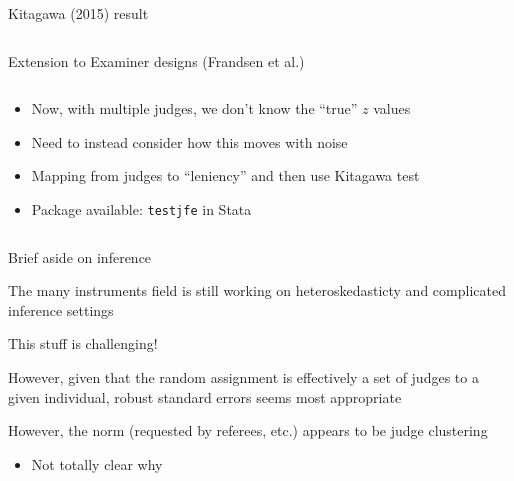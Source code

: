 \documentclass[notes,11pt, aspectratio=169]{beamer}
\newenvironment{wideitemize}{\itemize\addtolength{\itemsep}{10pt}}{\enditemize}
\begin{document}
\begin{frame}{Kitagawa (2015) result}
\begin{columns}[onlytextwidth, T]
\begin{column}{.5\textwidth}
    \end{column}%
  \end{columns}
\end{frame}

\begin{frame}{Extension to Examiner designs (Frandsen et al.)}
  \begin{columns}[onlytextwidth, T] %
    \begin{column}{.5\textwidth}
      \begin{itemize}
      \item Now, with multiple judges, we don't know the ``true'' $z$ values
      \item Need to instead consider how this moves with noise
      \item Mapping from judges to ``leniency'' and then use Kitagawa test
        \item Package available: \texttt{testjfe} in Stata
      \end{itemize}
    \end{column}%
    \hfill%
    \begin{column}{.5\textwidth}
    \end{column}%
  \end{columns}
\end{frame}


\begin{frame}{Brief aside on inference}
  \begin{wideitemize}
  \item The many instruments field is still working on heteroskedasticty and complicated inference settings
  \item This stuff is challenging!
  \item However, given that the random assignment is effectively a set
    of judges to a given individual, robust standard errors seems most appropriate
  \item However, the norm (requested by referees, etc.) appears to be judge clustering 
    \begin{itemize}
    \item   Not totally clear why
    \end{itemize}
  \end{wideitemize}
\end{frame}
\end{document}
